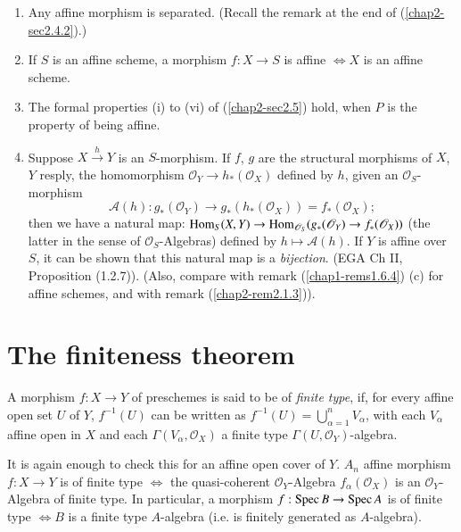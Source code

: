 \begin{remarks*}
\begin{enumerate}
\renewcommand{\theenumi}{\alph{enumi}}
\renewcommand{\labelenumi}{(\theenumi)}
\item Any affine morphism is separated. (Recall the remark at the end
  of (\ref{chap2-sec2.4.2}).)

\item If $S$ is an affine scheme, a morphism $f:X\to S$ is affine
  $\Leftrightarrow X$ is an affine scheme.

\item The formal properties (i) to (vi) of (\ref{chap2-sec2.5}) hold,
  when $P$ is the 
  property of being affine.

\item Suppose $X\xrightarrow{h}Y$ is an $S$-morphism. If $f$, $g$ are
  the structural morphisms of $X$, $Y$ resply, the homomorphism
  $\mathscr{O}_{Y}\to h_{\ast}(\mathscr{O}_{X})$ defined by $h$,
  given an $\mathscr{O}_{S}$-morphism
$$
\mathscr{A}(h):g_{\ast}(\mathscr{O}_{Y})\to
g_{\ast}(h_{\ast}(\mathscr{O}_{X}))=f_{\ast}(\mathscr{O}_{X}); 
$$
then we have a natural map: $\operatorname{Hom}_{S}(X,Y)\to
\operatorname{Hom}_{\mathscr{O}_{S}}(g_{\ast}(\mathscr{O}_{Y})\to
f_{\ast}(\mathscr{O}_{X}))$ (the latter in the sense of
$\mathscr{O}_{S}$-Algebras) defined by $h\mapsto \mathscr{A}(h)$. If
$Y$ is affine over $S$, it can be shown that this natural map is a
{\em bijection}. (EGA Ch II, Proposition (1.2.7)). (Also, compare with
remark (\ref{chap1-rems1.6.4}) (c) for affine schemes, and with remark
(\ref{chap2-rem2.1.3})). 
\end{enumerate}
\end{remarks*}

\section{The finiteness theorem}\pageoriginale\label{chap2-sec2.7}%

\setcounter{defin}{-1}
\begin{defin}\label{chap2-defi2.7.0}%
A morphism $f:X\to Y$ of preschemes is said to be of {\em finite
  type}, if, for every affine open set $U$ of $Y$, $f^{-1}(U)$ can be
written as $f^{-1}(U)=\bigcup\limits^{n}_{\alpha=1}V_{\alpha}$, with
each $V_{\alpha}$ affine open in $X$ and each
$\Gamma(V_{\alpha},\mathscr{O}_{X})$ a finite type
$\Gamma(U,\mathscr{O}_{Y})$-algebra. 
\end{defin}

It is again enough to check this for an affine open cover of
$Y$. $A_{n}$ affine morphism $f:X\to Y$ is of finite type
$\Longleftrightarrow$ the quasi-coherent $\mathscr{O}_{Y}$-Algebra
$f_{\alpha}(\mathscr{O}_{X})$ is an $\mathscr{O}_{Y}$-Algebra of
finite type. In particular, a morphism $f:\operatorname{Spec} B\to \operatorname{Spec} A$ is of
finite type $\Longleftrightarrow B$ is a finite type $A$-algebra
(i.e. is finitely generated as $A$-algebra).

